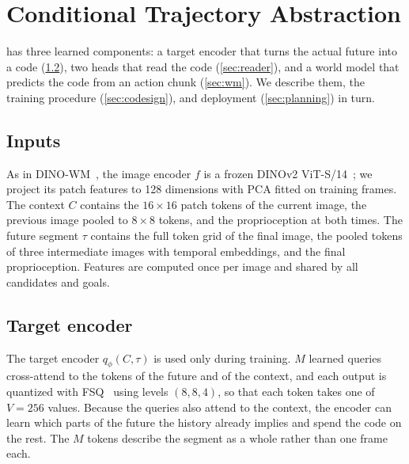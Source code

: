 \section{Conditional Trajectory Abstraction}
\label{sec:method}

\method has three learned components: a target encoder that turns the actual future into a code (\cref{sec:source}), two heads that read the code (\cref{sec:reader}), and a world model that predicts the code from an action chunk (\cref{sec:wm}).
We describe them, the training procedure (\cref{sec:codesign}), and deployment (\cref{sec:planning}) in turn.

\subsection{Inputs}
\label{sec:context}
As in DINO-WM~\cite{zhou2025dinowm}, the image encoder $f$ is a frozen DINOv2 ViT-S/14~\cite{oquab2024dinov2}; we project its patch features to 128 dimensions with PCA fitted on training frames.
The context $C$ contains the $16{\times}16$ patch tokens of the current image, the previous image pooled to $8{\times}8$ tokens, and the proprioception at both times.
The future segment $\tau$ contains the full token grid of the final image, the pooled tokens of three intermediate images with temporal embeddings, and the final proprioception.
Features are computed once per image and shared by all candidates and goals.

\subsection{Target encoder}
\label{sec:source}
The target encoder $q_\phi(C,\tau)$ is used only during training.
$M$ learned queries cross-attend to the tokens of the future and of the context, and each output is quantized with FSQ~\cite{mentzer2024fsq} using levels $(8,8,4)$, so that each token takes one of $V{=}256$ values.
Because the queries also attend to the context, the encoder can learn which parts of the future the history already implies and spend the code on the rest.
The $M$ tokens describe the segment as a whole rather than one frame each.

